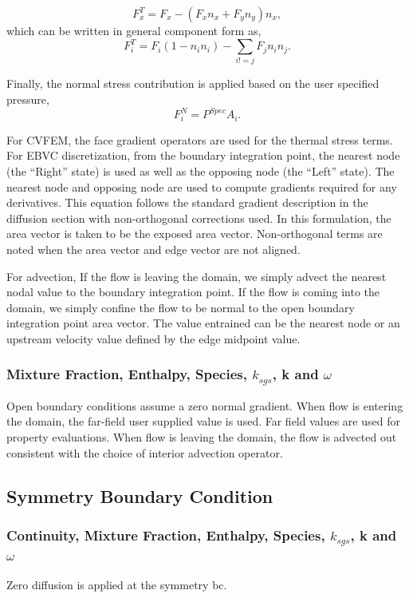 \begin{equation}
  F^T_x = F_x - (F_x n_x + F_y n_y ) n_x,
\end{equation}
which can be written in general component form as,
\begin{equation}
  F^T_i = F_i(1-n_i n_i) - \sum_{i!=j} F_j n_i n_j.
\end{equation}

Finally, the normal stress contribution is applied based on the user specified pressure,
\begin{equation}
  F^N_i = P^{Spec} A_i.
\end{equation}

For CVFEM, the face gradient operators are used for the thermal stress terms. For EBVC discretization, 
from the boundary integration
point, the nearest node (the ``Right'' state) is used as well as the opposing node
(the ``Left'' state). The nearest node and opposing node are used to compute
gradients required for any derivatives. This equation follows the standard
gradient description in the diffusion section with non-orthogonal corrections used.
In this formulation, the area vector is taken to be the exposed area vector. 
Non-orthogonal terms are noted when the area vector and edge vector are not aligned.

For advection, If the flow is leaving the domain, we simply advect the nearest nodal value
to the boundary integration point. If the flow is coming into the domain,
we simply confine the flow to be normal to the open boundary integration 
point area vector. The value entrained can be the nearest node
or an upstream velocity value defined by the edge midpoint value. 

\subsubsection{Mixture Fraction, Enthalpy, Species, $k_{sgs}$, k and $\omega$ }
Open boundary conditions assume a zero normal gradient. When flow is entering the domain, the far-field
user supplied value is used. Far field values are used for property evaluations. When flow is leaving the domain, 
the flow is advected out consistent with the
choice of interior advection operator.

\subsection{Symmetry Boundary Condition}

\subsubsection{Continuity, Mixture Fraction, Enthalpy, Species, $k_{sgs}$, k and $\omega$}
Zero diffusion is applied at the symmetry bc.

